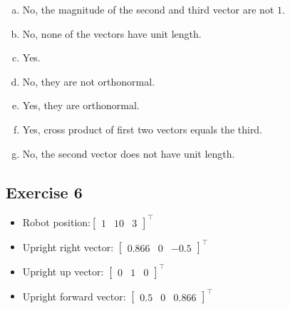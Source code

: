 \documentclass[11pt]{article}
\begin{document}
\begin{enumerate}[a.]
	\item No, the magnitude of the second and third vector are not $1$.
	\item No, none of the vectors have unit length.
	\item Yes.
	\item No, they are not orthonormal.
	\item Yes, they are orthonormal.
	\item Yes, cross product of first two vectors equals the third.
	\item No, the second vector does not have unit length.
\end{enumerate}

\subsection{Exercise 6}

\begin{itemize}
	\item Robot position:$\begin{bmatrix}
		1 & 10 & 3
	\end{bmatrix}^\intercal$
	\item Upright right vector: $\begin{bmatrix}
		0.866 & 0 & -0.5
	\end{bmatrix}^\intercal$
	\item Upright up vector: $\begin{bmatrix}
		0 & 1 & 0
	\end{bmatrix}^\intercal$
	\item Upright forward vector: $\begin{bmatrix}
		0.5 & 0 & 0.866
	\end{bmatrix}^\intercal$
\end{itemize}
\end{document}
